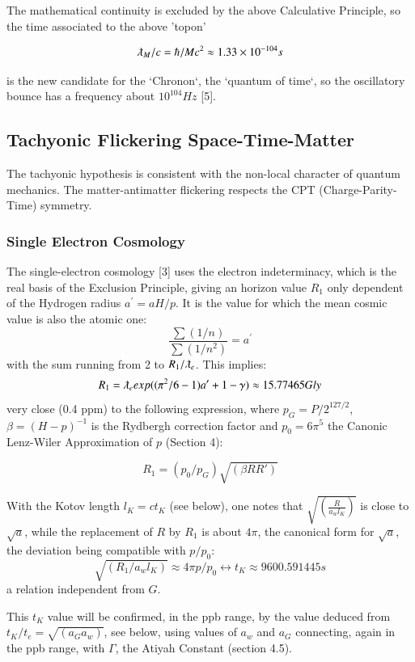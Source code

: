 \documentclass[twoside,draft]{article}
\begin{document}
\begin{sloppypar}
{The mathematical continuity is excluded by the above Calculative Principle, so the time associated
to the above 'topon' 

$$\lambdabar_{M} /c = \hbar/Mc^2 \approx 1.33 \times 10^{-104}s$$

is the new candidate for the `Chronon`, the `quantum of time`, so the
oscillatory bounce has a frequency about $10^{104}Hz$ [5].

\subsection{Tachyonic Flickering Space-Time-Matter}

The tachyonic hypothesis is consistent with the non-local character of quantum mechanics. The
matter-antimatter flickering respects the CPT (Charge-Parity-Time) symmetry.

\subsubsection{Single Electron Cosmology}

The single-electron cosmology [3] uses the electron indeterminacy, which is the real basis of the
Exclusion Principle, giving an horizon value $R_1$ only dependent of the Hydrogen radius $a^{\prime} = aH/p$. It
is the value for which the mean cosmic value is also the atomic one:
\begin{equation}
\frac{\sum(1/n)}{\sum(1/n^{2})} = a^{\prime}
\end{equation}
with the sum running from 2 to $R_{1} /\lambdabar_{e}$. This implies:
$$R_{1} = \lambdabar_{e} exp((\pi^{2} /6 - 1)a^{\prime} + 1 - \gamma) \approx 15.77465  Gly$$
very close (0.4 ppm) to the following expression, where $p_{G} = P/2^{127/2}$, $\beta = (H - p)^{-1}$ is the
Rydbergh correction factor and $p_{0} = 6\pi^{5}$ the Canonic Lenz-Wiler Approximation of $p$ (Section 4):

$$R_{1} = ( p_{0} /p_{G} ) \sqrt{(\beta R R\prime)}$$

With the Kotov length $l_{K} = ct_{K}$ (see below), one notes that $\sqrt{(\frac{R}{a_{w} l_{K}})}$ is close to $\sqrt{a}$, while
the replacement of $R$ by $R_{1}$ is about $4\pi$, the canonical form for $\sqrt{a}$, the deviation being compatible
with $p/p_{0}$:
$$\sqrt{(R_{1} /a_{w} l_{K})} \approx 4\pi p/p_{0} \leftrightarrow t_{K} \approx 9 600.591445 s$$ a relation independent from $G$. 

This $t_K$ value will be confirmed, in the ppb range, by the value
deduced from $t_{K} /t_{e} = \sqrt{(a_{G} a_{w})}$, see below, using values of $a_{w}$ and $a_{G}$ connecting, again in the ppb
range, with $\Gamma$, the Atiyah Constant (section 4.5).

}
\end{sloppypar}
\end{document}
